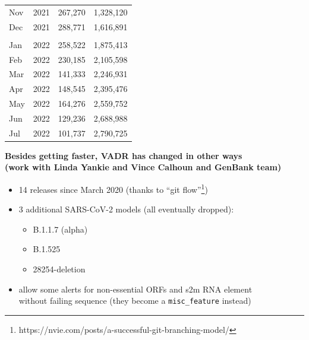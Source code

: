 \documentclass[landscape]{slides}
\begin{document}
\begin{slide}
\begin{center}
\begin{tabular}{llrr}
Nov       & 2021     &267,270   &1,328,120 \\ 
Dec       & 2021     &288,771   &1,616,891 \\ 
& & & \\
Jan       & 2022     &258,522   &1,875,413 \\ 
Feb       & 2022     &230,185   &2,105,598 \\ 
Mar       & 2022     &141,333   &2,246,931 \\ 
Apr       & 2022     &148,545   &2,395,476 \\
May       & 2022     &164,276   &2,559,752 \\
Jun       & 2022     &129,236   &2,688,988 \\
Jul       & 2022     &101,737   &2,790,725 \\
\end{tabular}
\end{center}

\vfill
\end{slide}
\begin{slide}
\begin{center}
\textbf{Besides getting faster, VADR has changed in other ways \\ (work with Linda Yankie and Vince Calhoun and GenBank team)}

\begin{itemize}
\item 14 releases since March 2020 (thanks to ``git flow''\footnote{https://nvie.com/posts/a-successful-git-branching-model/})
\item 3 additional SARS-CoV-2 models (all eventually dropped):
  \begin{itemize}
  \item B.1.1.7 (alpha)
  \item B.1.525
  \item 28254-deletion
  \end{itemize}
\item allow some alerts for non-essential ORFs and s2m RNA element \\ without failing sequence (they become a \texttt{misc\_feature} instead)
\end{itemize}

\end{center}

\vfill
\end{slide}
\end{document}
